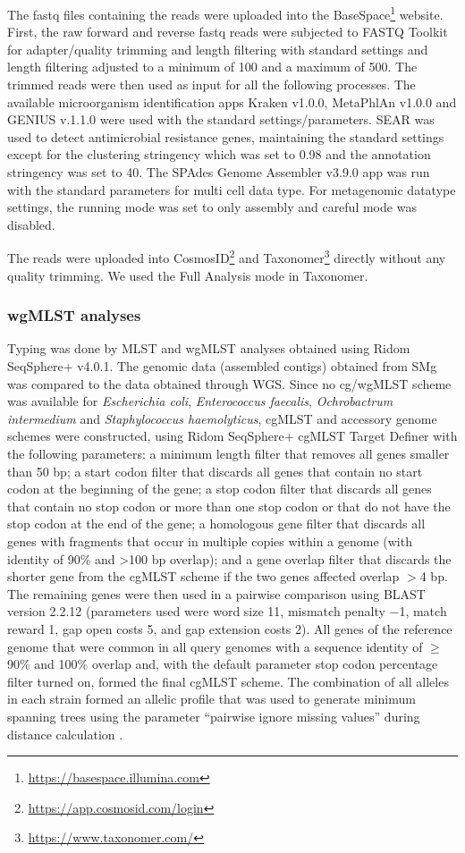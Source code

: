 The fastq files containing the reads were uploaded into the BaseSpace\footnote{\url{https://basespace.illumina.com}} website. 
First, the raw forward and reverse fastq reads were subjected to FASTQ Toolkit for adapter/quality trimming and length filtering with standard settings and length filtering adjusted to a minimum of 100 and a maximum of 500. 
The trimmed reads were then used as input for all the following processes. 
The available microorganism identification apps Kraken v1.0.0, MetaPhlAn v1.0.0 and GENIUS v.1.1.0 were used with the standard settings/parameters.
SEAR was used to detect antimicrobial resistance genes, maintaining the standard settings except for the clustering stringency which was set to 0.98 and the annotation stringency was set to 40.
The SPAdes Genome Assembler v3.9.0 app was run with the standard parameters for multi cell data type. 
For metagenomic datatype settings, the running mode was set to only assembly and careful mode was disabled. 

The reads were uploaded into CosmosID\footnote{\url{https://app.cosmosid.com/login}} and Taxonomer\footnote{\url{https://www.taxonomer.com/}} \citep{flygare_taxonomer_2016} directly without any quality trimming. 
We used the Full Analysis mode in Taxonomer.

\subsubsection{wgMLST analyses}

Typing was done by MLST and wgMLST analyses obtained using Ridom SeqSphere+ v4.0.1. 
The genomic data (assembled contigs) obtained from SMg was compared to the data obtained through WGS.
Since no cg/wgMLST scheme was available for \textit{Escherichia coli}, \textit{Enterococcus faecalis}, \textit{Ochrobactrum intermedium} and \textit{Staphylococcus haemolyticus}, cgMLST and accessory genome schemes were constructed, using Ridom SeqSphere+ cgMLST Target Definer with the following parameters: a minimum length filter that removes all genes smaller than 50 bp; a start codon filter that discards all genes that contain no start codon at the beginning of the gene; a stop codon filter that discards all genes that contain no stop codon or more than one stop codon or that do not have the stop codon at the end of the gene; a homologous gene filter that discards all genes with fragments that occur in multiple copies within a genome (with identity of 90\% and >100 bp overlap); and a gene overlap filter that discards the shorter gene from the cgMLST scheme if the two genes affected overlap $>$4 bp. 
The remaining genes were then used in a pairwise comparison using BLAST version 2.2.12 (parameters used were word size 11, mismatch penalty −1, match reward 1, gap open costs 5, and gap extension costs 2). 
All genes of the reference genome that were common in all query genomes with a sequence identity of $\geq$ 90\% and 100\% overlap and, with the default parameter stop codon percentage filter turned on, formed the final cgMLST scheme. 
The combination of all alleles in each strain formed an allelic profile that was used to generate minimum spanning trees using the parameter “pairwise ignore missing values” during distance calculation \citep{ruppitsch_defining_2015}.

